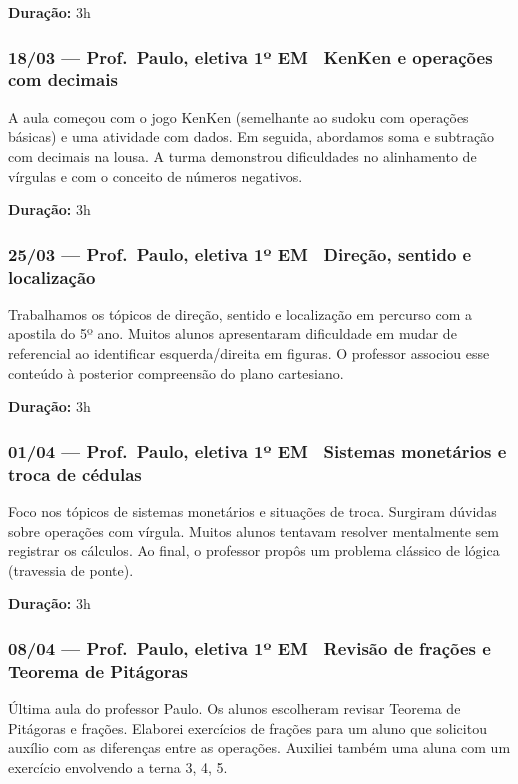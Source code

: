 \documentclass[11pt]{article}
\begin{document}
\textbf{Duração:} 3h

\subsubsection*{18/03 --- Prof.\ Paulo, eletiva 1º EM \textbar\ KenKen e operações com decimais}

A aula começou com o jogo KenKen (semelhante ao sudoku com operações básicas) e uma atividade com dados. Em seguida, abordamos soma e subtração com decimais na lousa. A turma demonstrou dificuldades no alinhamento de vírgulas e com o conceito de números negativos.

\textbf{Duração:} 3h

\subsubsection*{25/03 --- Prof.\ Paulo, eletiva 1º EM \textbar\ Direção, sentido e localização}

Trabalhamos os tópicos de direção, sentido e localização em percurso com a apostila do 5º ano. Muitos alunos apresentaram dificuldade em mudar de referencial ao identificar esquerda/direita em figuras. O professor associou esse conteúdo à posterior compreensão do plano cartesiano.

\textbf{Duração:} 3h

\subsubsection*{01/04 --- Prof.\ Paulo, eletiva 1º EM \textbar\ Sistemas monetários e troca de cédulas}

Foco nos tópicos de sistemas monetários e situações de troca. Surgiram dúvidas sobre operações com vírgula. Muitos alunos tentavam resolver mentalmente sem registrar os cálculos. Ao final, o professor propôs um problema clássico de lógica (travessia de ponte).

\textbf{Duração:} 3h

\subsubsection*{08/04 --- Prof.\ Paulo, eletiva 1º EM \textbar\ Revisão de frações e Teorema de Pitágoras}

Última aula do professor Paulo. Os alunos escolheram revisar Teorema de Pitágoras e frações. Elaborei exercícios de frações para um aluno que solicitou auxílio com as diferenças entre as operações. Auxiliei também uma aluna com um exercício envolvendo a terna 3, 4, 5.
\end{document}
